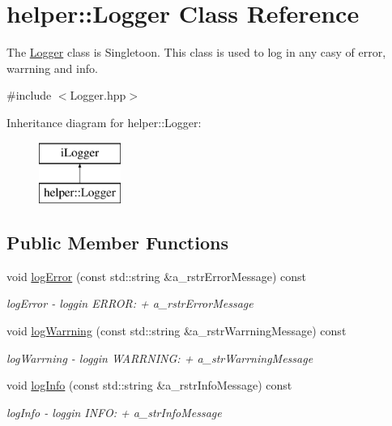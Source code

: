 \hypertarget{classhelper_1_1_logger}{}\section{helper\+::Logger Class Reference}
\label{classhelper_1_1_logger}


The \mbox{\hyperlink{classhelper_1_1_logger}{Logger}} class is Singletoon. This class is used to log in any casy of error, warrning and info.  




{\ttfamily \#include $<$Logger.\+hpp$>$}

Inheritance diagram for helper\+::Logger\+:\begin{figure}[H]
\begin{center}
\leavevmode
\includegraphics[height=2.000000cm]{classhelper_1_1_logger}
\end{center}
\end{figure}
\subsection*{Public Member Functions}
\begin{DoxyCompactItemize}
\item 
void \mbox{\hyperlink{classhelper_1_1_logger_aefbd6da65fd1a5326019ae5445bd0bc8}{log\+Error}} (const std\+::string \&a\+\_\+rstr\+Error\+Message) const
\begin{DoxyCompactList}\small\item\em log\+Error -\/ loggin E\+R\+R\+OR\+: + a\+\_\+rstr\+Error\+Message \end{DoxyCompactList}\item 
void \mbox{\hyperlink{classhelper_1_1_logger_ad857ce17cf393ea70cdb824e322c90c0}{log\+Warrning}} (const std\+::string \&a\+\_\+rstr\+Warrning\+Message) const
\begin{DoxyCompactList}\small\item\em log\+Warrning -\/ loggin W\+A\+R\+R\+N\+I\+NG\+: + a\+\_\+str\+Warrning\+Message \end{DoxyCompactList}\item 
void \mbox{\hyperlink{classhelper_1_1_logger_aa72f37ba4e8e56c1036e3ab70acc19c6}{log\+Info}} (const std\+::string \&a\+\_\+rstr\+Info\+Message) const
\begin{DoxyCompactList}\small\item\em log\+Info -\/ loggin I\+N\+FO\+: + a\+\_\+str\+Info\+Message \end{DoxyCompactList}\end{DoxyCompactItemize}
